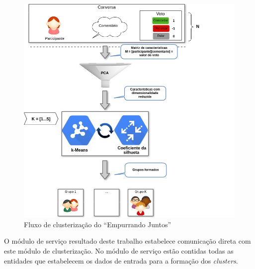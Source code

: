 \begin{figure}[h!]
\centering
\includegraphics[scale=0.7]{figuras/resumo_clusterizao_ej.png}
\caption{Fluxo de clusterização do ``Empurrando Juntos''}
\label{fig:resumo_clusterizao_ej}
\end{figure}


O módulo de serviço resultado deste trabalho estabelece comunicação direta com este módulo de clusterização. No módulo de serviço estão contidas todas
as entidades que estabelecem os dados de entrada para a formação dos \textit{clusters}.





